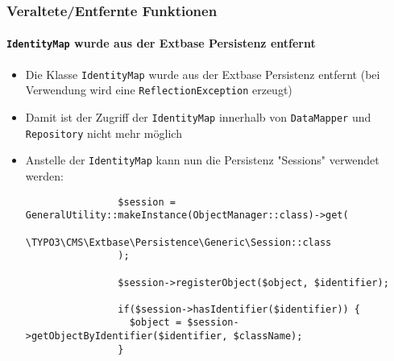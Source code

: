 
\begin{frame}[fragile]
	\frametitle{Veraltete/Entfernte Funktionen}
	\framesubtitle{\texttt{IdentityMap} wurde aus der Extbase Persistenz entfernt}

	\lstset{basicstyle=\tiny\ttfamily}

	\begin{itemize}

		\item Die Klasse \texttt{IdentityMap} wurde aus der Extbase Persistenz entfernt
			\small(bei Verwendung wird eine \texttt{ReflectionException} erzeugt)\normalsize

		\item Damit ist der Zugriff der \texttt{IdentityMap} innerhalb von
			\texttt{DataMapper} und \texttt{Repository} nicht mehr möglich

		\item Anstelle der \texttt{IdentityMap} kann nun die Persistenz "Sessions" verwendet werden:

			\begin{lstlisting}
				$session = GeneralUtility::makeInstance(ObjectManager::class)->get(
				  \TYPO3\CMS\Extbase\Persistence\Generic\Session::class
				);

				$session->registerObject($object, $identifier);

				if($session->hasIdentifier($identifier)) {
				  $object = $session->getObjectByIdentifier($identifier, $className);
				}
			\end{lstlisting}

	\end{itemize}

\end{frame}


